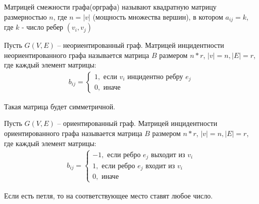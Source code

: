 \begin{definition}
    Матрицей смежности графа(орграфа) называют квадратную матрицу размерностью $n$, где $n=|v|$ (мощность множества вершин), в котором $a_{ij}=k$, где $k$ - число ребер $(v_i,v_j)$
\end{definition}

\begin{definition}
    Пусть $G(V,E)$ -- неориентированный граф. Матрицей инцидентности неориентированного графа называется матрица $B$ размером $n*r$, $|v| = n, |E| = r$, где каждый элемент матрицы:
	\begin{align*}
		b_{ij}=\left\{\begin{array}{l}
			1, \text{ если $v_i$ инцидентно ребру $e_j$}
			\\ 
			0, \text{ иначе}
		\end{array}\right.
	\end{align*}
\end{definition}
\noindent
Такая матрица будет симметричной.

\begin{definition}
    Пусть $G(V,E)$ -- ориентированный граф. Матрицей инцидентности ориентированного графа называется матрица $B$ размером $n*r$, $|v| = n, |E| = r$, где каждый элемент матрицы:
	\begin{align*}
		b_{ij}=\left\{\begin{array}{l}
			-1, \text{ если ребро $e_j$ выходит из $v_i$}
			\\
			1, \text{ если ребро $e_j$ входит из $v_i$}
			\\ 
			0, \text{ иначе}
		\end{array}\right.
	\end{align*}
\end{definition}

Если есть петля, то на соответствующее место ставят любое число.


